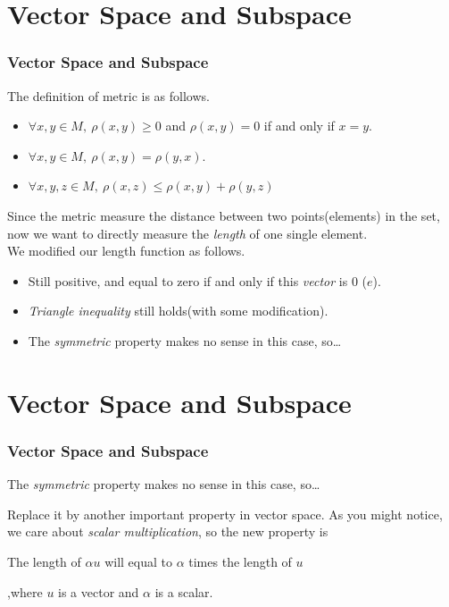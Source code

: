 \documentclass[12pt, t]{beamer}
\renewcommand{\emph}[1]{{\color{Turquoise3}\textsl{#1}}}
\begin{document}
\section{Vector Space and Subspace}
\begin{frame}
    \frametitle{Vector Space and Subspace}
The definition of metric is as follows.
\vspace{1em}
\begin{itemize}
    \item $\forall x,y\in M,\ \rho (x,y) \geq 0$ and $\rho (x,y)=0$ if and only if $x=y$.
    \item  $\forall x,y\in M,\ \rho (x,y)=\rho (y,x)$.
    \item  $\forall x,y,z\in M,\ \rho (x,z)\leq \rho (x,y)+\rho (y,z)$
\end{itemize}
\hspace{1em}
Since the metric measure the distance between two points(elements) in the set, now we want to directly measure the \emph{length} of one single element.\\
\vspace{1em}
\hspace{1em}
We modified our length function as follows.
\begin{itemize}
    \item Still positive, and equal to zero if and only if this \emph{vector} is 0 ($e$).
    \item \emph{Triangle inequality} still holds(with some modification).
    \item The \emph{symmetric} property makes no sense in this case, so\dots
\end{itemize}
    
\end{frame}

\section{Vector Space and Subspace}
\begin{frame}
    \frametitle{Vector Space and Subspace}
\begin{center}
    \center The \emph{symmetric} property makes no sense in this case, so\dots
\end{center}
\vspace{1em}

Replace it by another important property in vector space. As you might notice, we care about \emph{scalar multiplication}, so the new property is 
\begin{center}
    \center The length of $\alpha u$ will equal to $\alpha$ times the length of $u$
\end{center}
\vspace{1em}

,where $u$ is a vector and $\alpha$ is a scalar.


\end{frame}
\end{document}

